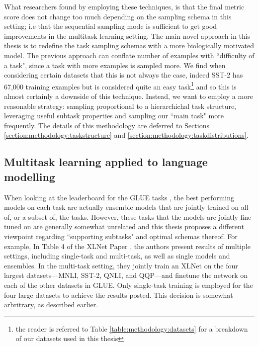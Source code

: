 {{What researchers found by employing these techniques, is that the final metric score does not change too much depending on the sampling schema in this setting; i.e that the sequential sampling mode is sufficient to get good improvements in the multitask learning setting. The main novel approach in this thesis is to redefine the task sampling schemas with a more biologically motivated model. The previous approach can conflate number of examples with ``difficulty of a task", since a task with more examples is sampled more. We find when considering certain datasets that this is not always the case, indeed SST-2 has 67,000 training examples but is considered quite an easy task\footnote{the reader is referred to Table \ref{table:methodology:datasets} for a breakdown of our datasets used in this thesis} and so this is almost certainly a downside of this technique. Instead, we want to employ a more reasonable strategy: sampling proportional to a hierarchichal task structure, leveraging useful subtask properties and sampling our ``main task" more frequently. The details of this methodology are deferred to Sections \ref{section:methodology:taskstructure} and \ref{section:methodology:taskdistributions}.

\subsection{Multitask learning applied to language modelling} \label{section:background:multitasklearningforLMs}
When looking at the leaderboard for the GLUE tasks \cite{Wang2018}, the best performing models on each task are actually ensemble models that are jointly trained on all of, or a subset of, the tasks. However, these tasks that the models are jointly fine tuned on are generally somewhat unrelated and this thesis proposes a different viewpoint regarding ``supporting subtasks" and optimal schemas thereof. For example, In Table 4 of the XLNet Paper \cite{Yang2019}, the authors present results of multiple settings, including single-task and multi-task, as well as single models and ensembles. In the multi-task setting, they jointly train an XLNet on the four largest datasets—MNLI, SST-2, QNLI, and QQP—and finetune the network on each of the other datasets in GLUE. Only single-task training is employed for the four large datasets to achieve the results posted. This decision is somewhat arbritrary, as described earlier.


}}
